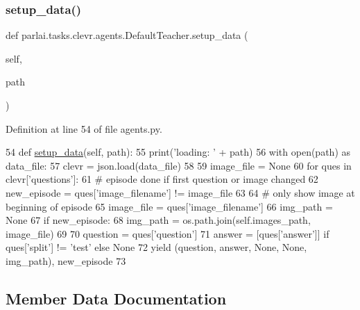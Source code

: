 \subsubsection{\texorpdfstring{setup\+\_\+data()}{setup\_data()}}
{\footnotesize\ttfamily def parlai.\+tasks.\+clevr.\+agents.\+Default\+Teacher.\+setup\+\_\+data (\begin{DoxyParamCaption}\item[{}]{self,  }\item[{}]{path }\end{DoxyParamCaption})}



Definition at line 54 of file agents.\+py.


\begin{DoxyCode}
54     \textcolor{keyword}{def }\hyperlink{namespaceparlai_1_1tasks_1_1multinli_1_1agents_a4fa2cb0ba1ed745336ad8bceed36b841}{setup\_data}(self, path):
55         print(\textcolor{stringliteral}{'loading: '} + path)
56         with open(path) \textcolor{keyword}{as} data\_file:
57             clevr = json.load(data\_file)
58 
59         image\_file = \textcolor{keywordtype}{None}
60         \textcolor{keywordflow}{for} ques \textcolor{keywordflow}{in} clevr[\textcolor{stringliteral}{'questions'}]:
61             \textcolor{comment}{# episode done if first question or image changed}
62             new\_episode = ques[\textcolor{stringliteral}{'image\_filename'}] != image\_file
63 
64             \textcolor{comment}{# only show image at beginning of episode}
65             image\_file = ques[\textcolor{stringliteral}{'image\_filename'}]
66             img\_path = \textcolor{keywordtype}{None}
67             \textcolor{keywordflow}{if} new\_episode:
68                 img\_path = os.path.join(self.images\_path, image\_file)
69 
70             question = ques[\textcolor{stringliteral}{'question'}]
71             answer = [ques[\textcolor{stringliteral}{'answer'}]] \textcolor{keywordflow}{if} ques[\textcolor{stringliteral}{'split'}] != \textcolor{stringliteral}{'test'} \textcolor{keywordflow}{else} \textcolor{keywordtype}{None}
72             \textcolor{keywordflow}{yield} (question, answer, \textcolor{keywordtype}{None}, \textcolor{keywordtype}{None}, img\_path), new\_episode
73 \end{DoxyCode}


\subsection{Member Data Documentation}
\mbox{\label{classparlai_1_1tasks_1_1clevr_1_1agents_1_1DefaultTeacher_a36fd7947d3c862e13b5964a573f22993}} 

